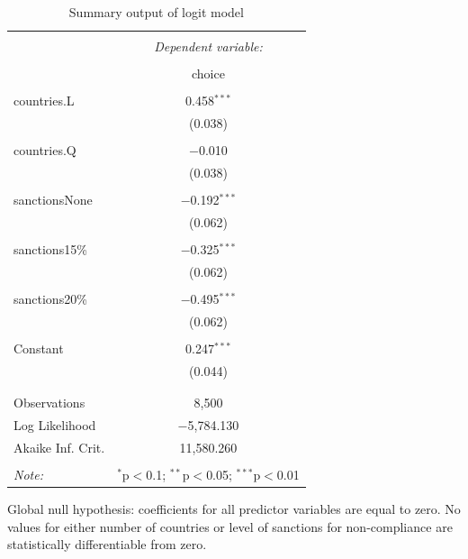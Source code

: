 \documentclass[12pt,letterpaper]{article}
\begin{document}
\begin{enumerate}
\begin{enumerate}
		\begin{table}[H] \centering 
			\caption{Summary output of logit model} 
			\label{} 
			\begin{tabular}{@{\extracolsep{5pt}}lc} 
				\\[-1.8ex]\hline 
				\hline \\[-1.8ex] 
				& \multicolumn{1}{c}{\textit{Dependent variable:}} \\ 
				\cline{2-2} 
				\\[-1.8ex] & choice \\ 
				\hline \\[-1.8ex] 
				countries.L & 0.458$^{***}$ \\ 
				& (0.038) \\ 
				& \\ 
				countries.Q & $-$0.010 \\ 
				& (0.038) \\ 
				& \\ 
				sanctionsNone & $-$0.192$^{***}$ \\ 
				& (0.062) \\ 
				& \\ 
				sanctions15\% & $-$0.325$^{***}$ \\ 
				& (0.062) \\ 
				& \\ 
				sanctions20\% & $-$0.495$^{***}$ \\ 
				& (0.062) \\ 
				& \\ 
				Constant & 0.247$^{***}$ \\ 
				& (0.044) \\ 
				& \\ 
				\hline \\[-1.8ex] 
				Observations & 8,500 \\ 
				Log Likelihood & $-$5,784.130 \\ 
				Akaike Inf. Crit. & 11,580.260 \\ 
				\hline 
				\hline \\[-1.8ex] 
				\textit{Note:}  & \multicolumn{1}{r}{$^{*}$p$<$0.1; $^{**}$p$<$0.05; $^{***}$p$<$0.01} \\ 
			\end{tabular} 
		\end{table} 
		
		Global null hypothesis: coefficients for all predictor variables are equal to zero. No values for either number of countries or level of sanctions for non-compliance are statistically differentiable from zero.\\
		

\end{enumerate}
\end{enumerate}
\end{document}
